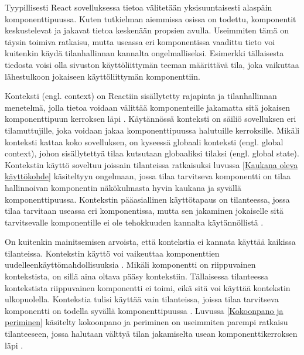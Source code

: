 Tyypillisesti React sovelluksessa tietoa välitetään yksisuuntaisesti alaspäin komponenttipuussa. Kuten tutkielman aiemmissa osissa on todettu, komponentit keskustelevat ja jakavat tietoa keskenään propsien avulla. Useimmiten tämä on täysin toimiva ratkaisu, mutta useassa eri komponentissa vaadittu tieto voi kuitenkin käydä tilanhallinnan kannalta ongelmalliseksi. Esimerkki tällaisesta tiedosta voisi olla sivuston käyttöliittymän teeman määrittävä tila, joka vaikuttaa lähestulkoon jokaiseen käyttöliittymän komponenttiin. \cite{reactdocscontext}

Konteksti (engl. context) on Reactiin sisällytetty rajapinta ja tilanhallinnan menetelmä, jolla tietoa voidaan välittää komponenteille jakamatta sitä jokaisen komponenttipuun kerroksen läpi \cite{reactdocscontext}. Käytännössä konteksti on säiliö sovelluksen eri tilamuttujille, joka voidaan jakaa komponenttipuussa halutuille kerroksille. Mikäli konteksti kattaa koko sovelluksen, on kyseessä globaali konteksti (engl. global context), johon sisällytettyä tilaa kutsutaan globaaliksi tilaksi (engl. global state). Kontekstin käyttö soveltuu joissain tilanteissa ratkaisuksi luvussa \ref{Kaukana oleva käyttökohde} käsiteltyyn ongelmaan, jossa tilaa tarvitseva komponentti on tilaa hallinnoivan komponentin näkökulmasta hyvin kaukana ja syvällä komponenttipuussa. Kontekstin pääasiallinen käyttötapaus on tilanteessa, jossa tilaa tarvitaan useassa eri komponentissa, mutta sen jakaminen jokaiselle sitä tarvitsevalle komponentille ei ole tehokkuuden kannalta käytännöllistä \cite{reactdocscontext}.

On kuitenkin mainitsemisen arvoista, että kontekstia ei kannata käyttää kaikissa tilanteissa. Kontekstin käyttö voi vaikeuttaa komponenttien uudelleenkäyttömahdollisuuksia \cite{reactdocscontext}. Mikäli komponentti on riippuvainen kontekstista, on sillä aina oltava pääsy kontekstiin. Tällaisessa tilanteessa kontekstista riippuvainen komponentti ei toimi, eikä sitä voi käyttää kontekstin ulkopuolella. Kontekstia tulisi käyttää vain tilanteissa, joissa tilaa tarvitseva komponentti on todella syvällä komponenttipuussa \cite{kentcdodds2}. Luvussa \ref{Kokoonpano ja periminen} käsitelty kokoonpano ja periminen on useimmiten parempi ratkaisu tilanteeseen, jossa halutaan välttyä tilan jakamiselta usean komponenttikerroksen läpi \cite{reactdocscontext}.

